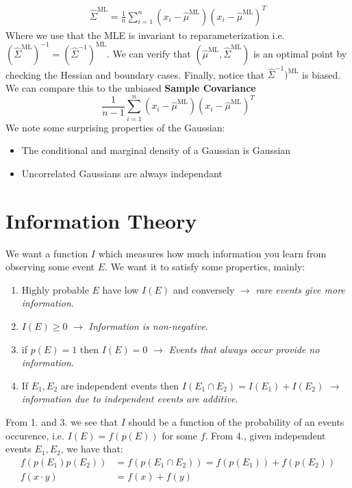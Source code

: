 \documentclass[]{article}
\theoremstyle{mattstyle}
\theoremstyle{definition}
\begin{document}
\begin{align*}
\boxed{\hat{\Sigma}^{\text{ML}} = \frac{1}{n}\sum_{i=1}^n(x_i-\hat{\mu}^{\text{ML}})(x_i-\hat{\mu}^{\text{ML}})^T}
\end{align*}
Where we use that the MLE is invariant to reparameterization i.e. $(\hat{\Sigma}^{\text{ML}})^{-1} = (\hat{\Sigma}^{-1})^{\text{ML}}$. We can verify that $(\hat{\mu}^{\text{ML}}, \hat{\Sigma}^{\text{ML}})$ is an optimal point by checking the Hessian and boundary cases. Finally, notice that $\hat{\Sigma}^{-1})^{\text{ML}}$ is biased. We can compare this to the unbiased \textbf{Sample Covariance} 
$$\frac{1}{n-1}\sum_{i=1}^n(x_i-\hat{\mu}^{\text{ML}})(x_i-\hat{\mu}^{\text{ML}})^T$$
We note some surprising properties of the Gaussian:
\begin{itemize}
	\item The conditional and marginal density of a Gaussian is Gaussian
	\item Uncorrelated Gaussians are always independant
\end{itemize}

\newpage

\section{Information Theory}

We want a function $I$ which measures how much information you learn from observing some event $E$. We want it to satisfy some properties, mainly:

\begin{enumerate}
	\item Highly probable $E$ have low $I(E)$ and conversely $\rightarrow$ \emph{ rare events give more information}.
	\item $I(E) \ge 0$ $\rightarrow$\emph{ Information is non-negative}.
	\item if $p(E)=1$ then $I(E) = 0$ $\rightarrow$\emph{ Events that always occur provide no information}.
	\item If $E_1, E_2$ are independent events then $I(E_1 \cap E_2) = I(E_1) + I(E_2)$ $\rightarrow$\emph{ information due to independent events are additive}.
\end{enumerate}
From 1. and 3. we see that $I$ should be a function of the probability of an events occurence, i.e. $I(E)=f(p(E))$ for some $f$. From 4., given independent events $E_1, E_2$, we have that:
\begin{align}\label{eq:entnec}
f(p(E_1)p(E_2)) &= f(p(E_1\cap E_2)) = f(p(E_1)) + f(p(E_2))\\
f(x\cdot y) &= f(x) + f(y)
\end{align}
\end{document}
